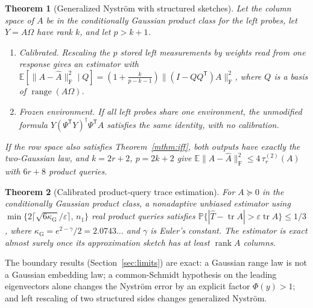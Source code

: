 \documentclass[11pt,a4paper]{article}
\newtheorem{mainthm}{Theorem}
\theoremstyle{definition}
\theoremstyle{remark}
\numberwithin{equation}{section}
\newcommand{\E}{\mathbb E}
\newcommand{\Prob}{\mathbb P}
\newcommand{\T}{{\mathsf T}}
\newcommand{\tr}{\operatorname{tr}}
\newcommand{\rank}{\operatorname{rank}}
\newcommand{\range}{\operatorname{range}}
\newcommand{\norm}[1]{\lVert#1\rVert}
\newcommand{\eps}{\varepsilon}
\newcommand{\kapG}{\kappa_{\mathrm G}}
\newcommand{\F}{\mathrm F}
\begin{document}
\begin{mainthm}[Generalized Nystr\"om with structured sketches]\label{mthm:gn}
Let the column space of $A$ be in the conditionally Gaussian product class
for the left probes, let $Y=A\Omega$ have rank $k$, and let $p>k+1$.
\begin{enumerate}[label=\textup{(\roman*)}]
\item \emph{Calibrated.} Rescaling the $p$ stored left measurements by weights
      read from one response gives an estimator with
      $\E[\norm{A-\widehat A}_\F^2\mid Q]=(1+\tfrac{k}{p-k-1})
      \norm{(I-QQ^\T)A}_\F^2$, where $Q$ is a basis of $\range(A\Omega)$.
\item \emph{Frozen environment.} If all left probes share one environment,
      the unmodified formula $Y(\Psi^\T Y)^\dagger\Psi^\T A$ satisfies the same
      identity, with no calibration.
\end{enumerate}
If the row space also satisfies Theorem~\ref{mthm:iff}, both outputs have
exactly the two-Gaussian law, and $k=2r+2$, $p=2k+2$ give
$\E\norm{A-\widehat A}_\F^2\le4\,\tau_r^{(2)}(A)$ with $6r+8$ product queries.
\end{mainthm}

\begin{mainthm}[Calibrated product-query trace estimation]\label{mthm:trace}
For $A\succeq0$ in the conditionally Gaussian product class, a nonadaptive
unbiased estimator using
$\min\{2\lceil\sqrt{6\kapG}/\eps\rceil,\,n_1\}$ real product queries satisfies
$\Prob\{|\widehat T-\tr A|>\eps\tr A\}\le1/3$, where
$\kapG=e^{2-\gamma}/2=2.0743\ldots$ and $\gamma$ is Euler's constant. The
estimator is exact almost surely once its approximation sketch has at least
$\rank A$ columns.
\end{mainthm}

The boundary results (Section~\ref{sec:limits}) are exact: a Gaussian range
law is not a Gaussian embedding law; a common-Schmidt hypothesis on the
leading eigenvectors alone changes the Nystr\"om error by an explicit factor
$\Phi(y)>1$; and left rescaling of two structured sides changes generalized
Nystr\"om.
\end{document}
